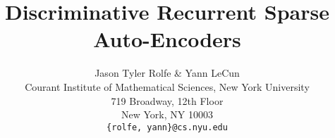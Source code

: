 \documentclass{article} %
\title{Discriminative Recurrent Sparse Auto-Encoders}
\author{
Jason Tyler Rolfe \& Yann LeCun \\ %
Courant Institute of Mathematical Sciences, New York University\\ 
719 Broadway, 12th Floor \\
New York, NY 10003\\
\texttt{\{rolfe, yann\}@cs.nyu.edu} \\
}
\begin{document}

\maketitle



\begin{comment} 
Recurrent sparse networks have the potential to exhibit all the power of deep networks, while substantially reducing the number of parameters that must be trained.
We present discriminative recurrent sparse autoencoders, which consist of a generatively pretrained and discriminatively fine-tuned recurrent network of rectified linear units.
From an initially unstructured recurrent network, the hidden units of discriminative recurrent sparse autoencoders naturally organize into a hierarchy of features.  The most abstract units use a sophisticated form of pooling to gradually integrate %
over the lower-level units, and implement templates for each supervised class.  The lower-level units directly construct a sparse, part-based decomposition of the residual input after the template is subtracted, distinguishing between directions parallel and orthogonal to the data manifold.  %
Even using a small number of hidden units per layer, discriminative recurrent sparse autoencoders can achieve near state-of-the-art performance on permutation-agnostic handwritten digit recognition.
\end{comment}
\end{document}
